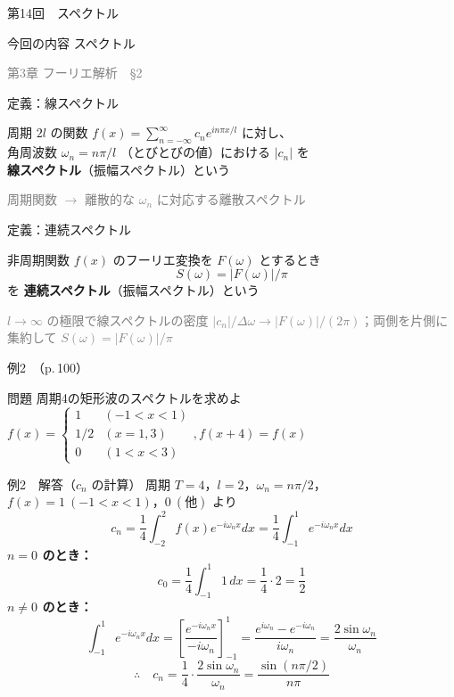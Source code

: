 \documentclass[professionalfonts]{beamer}
\begin{document}
\begin{frame}{第14回　スペクトル}
  \begin{block}{今回の内容}
  スペクトル
  \end{block}
  \vfill\hfill{\scriptsize \textcolor{gray}{第3章 フーリエ解析　§2}}
\end{frame}

\begin{frame}{定義：線スペクトル}
  \begin{block}{}
  周期 $2l$ の関数 $f(x) = \sum_{n=-\infty}^\infty c_{n} e^{in\pi x/l}$ に対し、\\[4pt]
  角周波数 $\omega_{n} = n\pi/l$ （とびとびの値）における $|c_{n}|$ を\\[4pt]
  \textbf{線スペクトル}（振幅スペクトル）という
  \end{block}
  {\footnotesize \textcolor{gray}{周期関数 $\to$ 離散的な $\omega_{n}$ に対応する離散スペクトル}}
\end{frame}

\begin{frame}{定義：連続スペクトル}
  \begin{block}{}
  非周期関数 $f(x)$ のフーリエ変換を $F(\omega)$ とするとき\\[4pt]
  \[
    S(\omega) = |F(\omega)| / \pi
  \]
  を \textbf{連続スペクトル}（振幅スペクトル）という
  \end{block}
  {\footnotesize \textcolor{gray}{$l\to\infty$ の極限で線スペクトルの密度 $|c_{n}|/\Delta\omega \to |F(\omega)|/(2\pi)$；両側を片側に集約して $S(\omega)=|F(\omega)|/\pi$}}
\end{frame}

\begin{frame}{例2　（p.\,100）}
  \begin{exampleblock}{問題}
    周期4の矩形波のスペクトルを求めよ\\[2pt]
    $f(x) = \begin{cases} 1 & (-1 < x < 1) \\ 1/2 & (x = 1, 3) \\ 0 & (1 < x < 3) \end{cases},  f(x+4) = f(x)$\\[2pt]
  \end{exampleblock}
\end{frame}

\begin{frame}{例2　解答（$c_n$ の計算）}
  周期 $T=4$，$l=2$，$\omega_n=n\pi/2$，$f(x)=1\ (-1<x<1)$，$0\ (\text{他})$ より
  \[
    c_n = \frac{1}{4}\int_{-2}^{2}f(x)e^{-i\omega_n x}dx = \frac{1}{4}\int_{-1}^{1}e^{-i\omega_n x}dx
  \]
  \textbf{$n=0$ のとき：}
  \[
    c_0 = \frac{1}{4}\int_{-1}^{1}1\,dx = \frac{1}{4}\cdot 2 = \frac{1}{2}
  \]
  \textbf{$n\neq 0$ のとき：}
  \[
    \int_{-1}^{1}e^{-i\omega_n x}dx
    = \left[\frac{e^{-i\omega_n x}}{-i\omega_n}\right]_{-1}^{1}
    = \frac{e^{i\omega_n}-e^{-i\omega_n}}{i\omega_n}
    = \frac{2\sin\omega_n}{\omega_n}
  \]
  \[
    \therefore\quad c_n = \frac{1}{4}\cdot\frac{2\sin\omega_n}{\omega_n}
    = \frac{\sin(n\pi/2)}{n\pi}
  \]
\end{frame}
\end{document}

